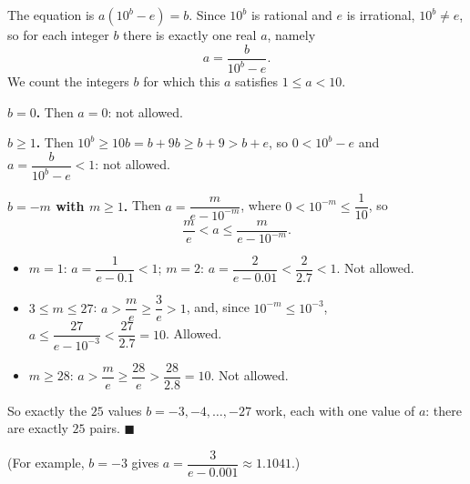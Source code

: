 The equation is $a\left(10^b-e\right)=b$. Since $10^b$ is rational and $e$ is irrational, $10^b\ne e$, so for each integer $b$ there is exactly one real $a$, namely
\[a=\dfrac{b}{10^b-e}.\]
We count the integers $b$ for which this $a$ satisfies $1\le a<10$.

\textbf{$b=0$.} Then $a=0$: not allowed.

\textbf{$b\ge1$.} Then $10^b\ge10b=b+9b\ge b+9>b+e$, so $0<10^b-e$ and $a=\dfrac{b}{10^b-e}<1$: not allowed.

\textbf{$b=-m$ with $m\ge1$.} Then $a=\dfrac{m}{e-10^{-m}}$, where $0<10^{-m}\le\dfrac1{10}$, so
\[\dfrac me<a\le\dfrac{m}{e-10^{-m}}.\]
\begin{itemize}
\item $m=1$: $a=\dfrac{1}{e-0.1}<1$; $m=2$: $a=\dfrac{2}{e-0.01}<\dfrac{2}{2.7}<1$. Not allowed.
\item $3\le m\le27$: $a>\dfrac me\ge\dfrac3e>1$, and, since $10^{-m}\le10^{-3}$, $a\le\dfrac{27}{e-10^{-3}}<\dfrac{27}{2.7}=10$. Allowed.
\item $m\ge28$: $a>\dfrac me\ge\dfrac{28}{e}>\dfrac{28}{2.8}=10$. Not allowed.
\end{itemize}
So exactly the $25$ values $b=-3,-4,\dots,-27$ work, each with one value of $a$: there are exactly $\boxed{25}$ pairs. $\blacksquare$

(For example, $b=-3$ gives $a=\dfrac{3}{e-0.001}\approx1.1041$.)
